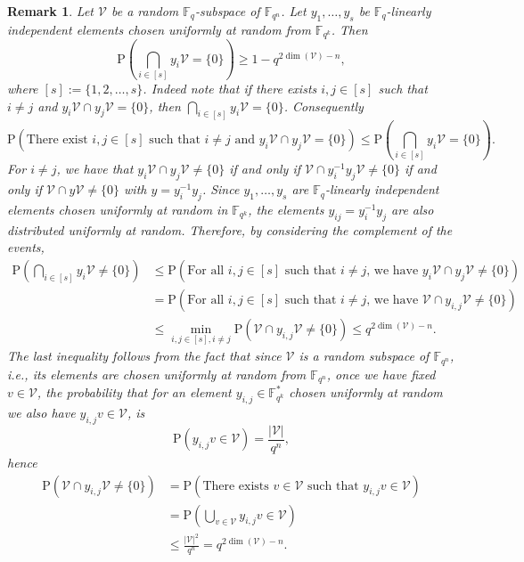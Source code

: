 \documentclass{article}
\newtheorem{remark}{Remark}
\newcommand{\Fq}{\mathbb{F}_{q}}
\newcommand{\Fqn}{\mathbb{F}_{q^n}}
\newcommand{\Fqk}{\mathbb{F}_{q^k}}
\newcommand{\calV}{\mathcal{V}}
\begin{document}
\begin{remark}
    \label{prop: probability reduction goes to zero}
    Let $\calV$ be a random $\Fq$-subspace of $\Fqn$. Let $y_1,\ldots,y_s$ be $\Fq$-linearly independent elements chosen uniformly at random from $\Fqk$. Then 
    \[
    \mathrm{P}\left(\bigcap_{i\in [s]} y_i\calV=\{0\}\right)\geq 1-q^{2\dim(\calV)-n},
    \]where $[s]:=\{1,2,\dots,s\}$. Indeed note that if there exists $i,j\in[s]$ such that $i\neq j$ and $y_i\calV\cap y_j\calV=\{0\}$, then $\bigcap_{i\in [s]} y_i\calV=\{0\}$. Consequently 
    \[
    \mathrm{P}(\text{There exist }i,j\in[s]\text{ such that }i\neq j\text{ and }y_i\calV\cap y_j\calV=\{0\})\leq \mathrm{P}\left(\bigcap_{i\in [s]} y_i\calV=\{0\}\right).
    \]
    For $i\neq j$, we have that $y_i\calV\cap y_j\calV\neq\{0\}$ if and only if $\calV\cap y_i^{-1}y_j\calV\neq\{0\}$ if and only if $\calV\cap y\calV\neq\{0\}$ with $y=y_i^{-1}y_j$. Since $y_1,\ldots,y_s$ are $\Fq$-linearly independent elements chosen uniformly at random in $\Fqk$, the elements $y_{ij}=y_i^{-1}y_j$ are also distributed uniformly at random.
    Therefore, by considering the complement of the events,
    \begin{align*}
        \mathrm{P}\left(\bigcap_{i\in [s]} y_i\calV\neq\{0\}\right)&\leq\mathrm{P}(\text{For all }i,j\in[s]\text{ such that }i\neq j\text{, we have }y_i\calV\cap y_j\calV\neq\{0\})\\
        &=\mathrm{P}(\text{For all }i,j\in[s]\text{ such that }i\neq j\text{, we have }\calV\cap y_{i,j}\calV\neq\{0\})\\
        &\leq \min_{i,j\in[s],i\neq j}\mathrm{P}(\calV\cap y_{i,j}\calV\neq\{0\})\leq q^{2\dim(\calV)-n}.
    \end{align*}
    The last inequality follows from the fact that since $\calV$ is a random subspace of $\Fqn$, i.e., its elements are chosen uniformly at random from $\Fqn$, once we have fixed $v\in\calV$, the probability that for an element $y_{i,j}\in\Fqk^*$ chosen uniformly at random we also have $y_{i,j}v\in\calV$, is 
    \[
    \mathrm{P}(y_{i,j}v\in\calV)=\frac{\lvert\calV\rvert}{q^n},
    \]
    hence
    \begin{align*}
        \mathrm{P}(\calV\cap y_{i,j}\calV\neq\{0\})&=\mathrm{P}(\text{There exists }v\in\calV\text{ such that }y_{i,j}v\in\calV)\\
        &=\mathrm{P}\left(\bigcup_{v\in\calV}y_{i,j}v\in\calV\right)\\
        &\leq \frac{\lvert\calV\rvert^2}{q^n}=q^{2\dim(\calV)-n}.
    \end{align*}
\end{remark}
\end{document}
